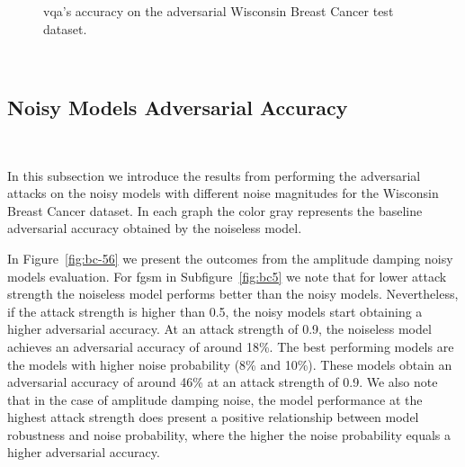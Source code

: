 \begin{figure}[!h]
  \caption{\ac{vqa}'s accuracy on the adversarial Wisconsin Breast Cancer test dataset.}
  \label{fig:bc-34}
\end{figure} \

\subsection{Noisy Models Adversarial Accuracy}\label{subsection:breast-cancer-noisy-adv-acc} \

In this subsection we introduce the results from performing
the adversarial attacks on the noisy models with different noise
magnitudes for the Wisconsin Breast Cancer dataset. In each graph
the color gray represents the baseline adversarial accuracy obtained
by the noiseless model. \

In Figure~\ref{fig:bc-56} we present the outcomes from the amplitude
damping noisy models evaluation. For \ac{fgsm} in Subfigure~\ref{fig:bc5}
we note that for lower attack strength the noiseless model performs
better than the noisy models. Nevertheless, if the attack strength is
higher than 0.5, the noisy models start obtaining a higher adversarial
accuracy. At an attack strength of 0.9, the noiseless model achieves
an adversarial accuracy of around 18\%. The best performing models
are the models with higher noise probability (8\% and 10\%). These
models obtain an adversarial accuracy of around 46\% at an attack
strength of 0.9. We also note that in the case of amplitude damping
noise, the model performance at the highest attack strength does
present a positive relationship between model robustness and
noise probability, where the higher the noise probability equals
a higher adversarial accuracy. \


